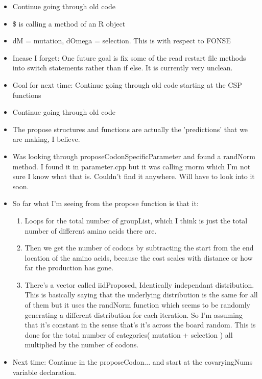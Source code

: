 \documentclass[letterpaper,index=totoc,hyperref,openany]{labbook} %
\begin{document}

\begin{itemize}
	\item Continue going through old code
\end{itemize}

\begin{itemize}
	\item \$ is calling a method of an R object
	\item dM = mutation, dOmega = selection. This is with respect to FONSE
	\item Incase I forget: One future goal is fix some of the read restart file methods into switch statements rather than if else. It is currently very unclean.
	\item Goal for next time: Continue going through old code starting at the CSP functions

\end{itemize}


\begin{itemize}
	\item Continue going through old code
\end{itemize}

\begin{itemize}
	\item The propose structures and functions are actually the 'predictions' that we are making, I believe.
	\item Was looking through proposeCodonSpecificParameter and found a randNorm method. I found it in parameter.cpp but it was calling rnorm which I'm not sure I know what that is. Couldn't find it anywhere.  Will have to look into it soon.
	\item So far what I'm seeing from the propose function is that it:
	\begin{enumerate}
		\item Loops for the total number of groupList, which I think is just the total number of different amino acids there are.
		\item Then we get the number of codons by subtracting the start from the end location of the amino acids, because the cost scales with distance or how far the production has gone.
		\item There's a vector called iidProposed, Identically independant distribution. This is basically saying that the underlying distribution is the same for all of them but it uses the randNorm function which seems to be randomly generating a different distribution for each iteration. So I'm assuming that it's constant in the sense that's it's across the board random. This is done for the total number of categories( mutation + selection ) all multiplied by the number of codons.
	\end{enumerate}
	\item Next time: Continue in the proposeCodon... and start at the covaryingNums variable declaration.
\end{itemize}
\end{document}
